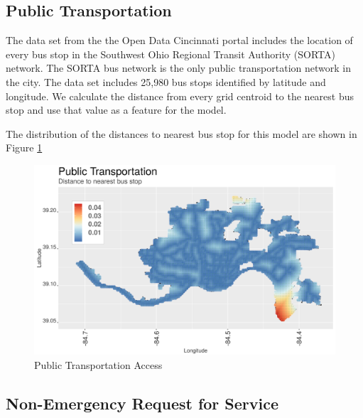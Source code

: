 \documentclass{llncs}
\begin{document}

\subsection{Public Transportation}

The data set from the the Open Data Cincinnati portal  includes the location of every bus stop in the  Southwest Ohio Regional Transit Authority (SORTA) network. The SORTA bus network is the only public transportation network in the city. The data set includes 25,980 bus stops identified by latitude and longitude. We calculate the distance from every grid centroid to the nearest bus stop and use that value as a feature for the model. 

The distribution of the distances to nearest bus stop for this model are shown in Figure \ref{figure : busStopDistances}

\FloatBarrier
\begin{figure}
 	\includegraphics[width=\textwidth, height=\textheight, keepaspectratio]{busStopDistances}
 	\caption{Public Transportation Access}
	\label{figure : busStopDistances}
\end{figure}
\FloatBarrier


\subsection{Non-Emergency Request for Service}
\end{document}
